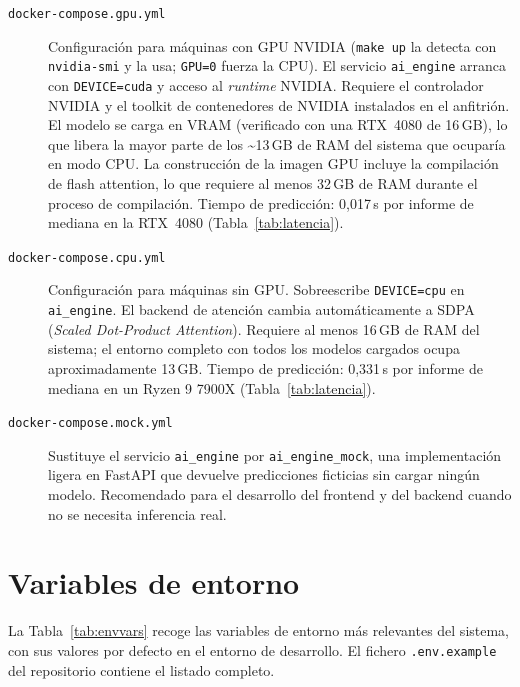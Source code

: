 \begin{description}
 \item[\texttt{docker-compose.gpu.yml}] Configuración para máquinas con GPU NVIDIA (\texttt{make up} la detecta con \texttt{nvidia-smi} y la usa; \texttt{GPU=0} fuerza la CPU). El servicio \texttt{ai\_engine} arranca con \texttt{DEVICE=cuda} y acceso al \emph{runtime} NVIDIA. Requiere el controlador NVIDIA y el toolkit de contenedores de NVIDIA instalados en el anfitrión. El modelo se carga en VRAM (verificado con una RTX~4080 de 16\,GB), lo que libera la mayor parte de los \textasciitilde{}13\,GB de RAM del sistema que ocuparía en modo CPU. La construcción de la imagen GPU incluye la compilación de flash attention, lo que requiere al menos 32\,GB de RAM durante el proceso de compilación. Tiempo de predicción: 0{,}017\,s por informe de mediana en la RTX~4080 (Tabla~\ref{tab:latencia}).

 \item[\texttt{docker-compose.cpu.yml}] Configuración para máquinas sin GPU. Sobreescribe \texttt{DEVICE=cpu} en \texttt{ai\_engine}. El backend de atención cambia automáticamente a SDPA (\emph{Scaled Dot-Product Attention}). Requiere al menos 16\,GB de RAM del sistema; el entorno completo con todos los modelos cargados ocupa aproximadamente 13\,GB. Tiempo de predicción: 0{,}331\,s por informe de mediana en un Ryzen 9 7900X (Tabla~\ref{tab:latencia}).

 \item[\texttt{docker-compose.mock.yml}] Sustituye el servicio \texttt{ai\_engine} por \texttt{ai\_engine\_mock}, una implementación ligera en FastAPI que devuelve predicciones ficticias sin cargar ningún modelo. Recomendado para el desarrollo del frontend y del backend cuando no se necesita inferencia real.
\end{description}

\section{Variables de entorno}

La Tabla~\ref{tab:envvars} recoge las variables de entorno más relevantes del sistema, con sus valores por defecto en el entorno de desarrollo. El fichero \texttt{.env.example} del repositorio contiene el listado completo.

